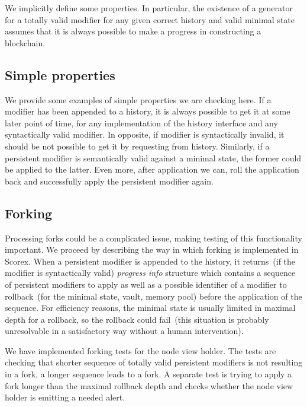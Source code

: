 We implicitly define some properties. In particular, the existence of a generator for a totally valid modifier for any given correct history and valid minimal state assumes that it is always possible to make a progress in constructing a blockchain.

\subsection{Simple properties}
\label{sec:simple-props}

We provide some examples of simple properties we are checking here. If a modifier has been appended to a history, it is always possible to get it at some later point of time, for any implementation of the history interface and any syntactically valid modifier. In opposite, if modifier is syntactically invalid, it should be not possible to get it by requesting from history. Similarly, if a persistent modifier is semantically valid against a minimal state, the former could be applied to the latter. Even more, after application we can, roll the application back and successfully apply the persistent modifier again.  

\subsection{Forking}
\label{sec:forking}

Processing forks could be a complicated issue, making testing of this functionality important. We proceed by describing the way in which forking is implemented in Scorex. When a persistent modifier is appended to the history, it returns~(if the modifier is syntactically valid) {\em progress info} structure which contains a sequence of persistent modifiers to apply as well as a possible identifier of a modifier to rollback~(for the minimal state, vault, memory pool) before the application of the sequence. For efficiency reasons, the minimal state is usually limited in maximal depth for a rollback, so the rollback could fail~(this situation is probably unresolvable in a satisfactory way without a human intervention). 

We have implemented forking tests for the node view holder. The tests are checking that shorter sequence of totally valid persistent modifiers is not resulting in a fork, a longer sequence leads to a fork. A separate test is trying to apply a fork longer than the maximal rollback depth and checks whether the node view holder is emitting a needed alert.
